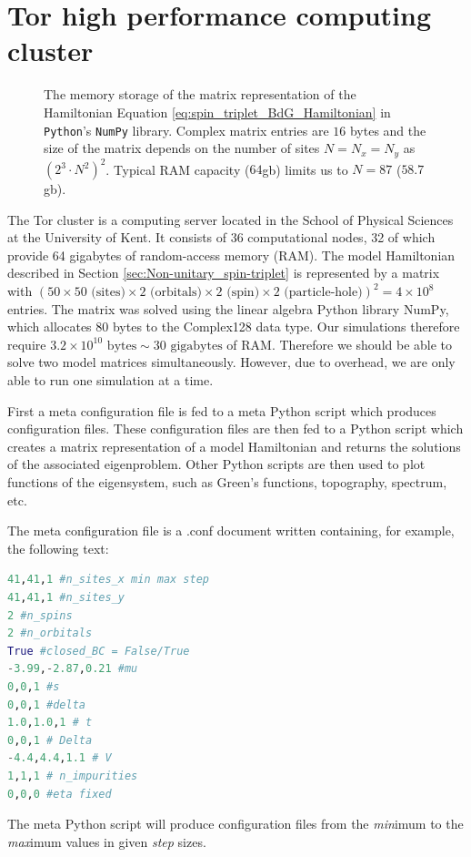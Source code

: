 \chapter{\label{ap:tor}Tor high performance computing cluster}
\graphicspath{{}}

\begin{figure}
    \begin{center}
        
    \end{center}
    \caption{\label{fig:Memory_usage_plot}
    The memory storage of the matrix representation of the Hamiltonian Equation \ref{eq:spin_triplet_BdG_Hamiltonian} in \texttt{Python}'s \texttt{NumPy} library. Complex matrix entries are $16$ bytes and the size of the matrix depends on the number of sites $N=N_x=N_y$ as $\left(2^3\cdot N^2\right)^2$. Typical RAM capacity ($64$gb) limits us to $N=87$ ($58.7$gb).
    }
\end{figure}

The Tor cluster is a computing server located in the School of Physical Sciences at the University of Kent. It consists of 36 computational nodes, 32 of which provide 64 gigabytes of random-access memory (RAM). The model Hamiltonian described in Section \ref{sec:Non-unitary_spin-triplet} is represented by a matrix with $(50 \times 50 \text{ (sites)} \times 2 \text{ (orbitals)} \times 2 \text{ (spin)} \times 2 \text{ (particle-hole)})^2 = 4\times 10^8$ entries. The matrix was solved using the linear algebra Python library NumPy, which allocates 80 bytes to the Complex128 data type. Our simulations therefore require $3.2\times 10^{10} \text{ bytes} \sim 30 \text{ gigabytes}$ of RAM. Therefore we should be able to solve two model matrices simultaneously. However, due to overhead, we are only able to run one simulation at a time.

First a meta configuration file is fed to a meta Python script which produces configuration files. These configuration files are then fed to a Python script which creates a matrix representation of a model Hamiltonian and returns the solutions of the associated eigenproblem. Other Python scripts are then used to plot functions of the eigensystem, such as Green's functions, topography, spectrum, etc.

The meta configuration file is a .conf document written containing, for example, the following text:
\begin{lstlisting}[language=Python]
41,41,1 #n_sites_x min max step
41,41,1 #n_sites_y
2 #n_spins
2 #n_orbitals
True #closed_BC = False/True
-3.99,-2.87,0.21 #mu
0,0,1 #s
0,0,1 #delta
1.0,1.0,1 # t
0,0,1 # Delta
-4.4,4.4,1.1 # V
1,1,1 # n_impurities
0,0,0 #eta fixed
\end{lstlisting}
The meta Python script will produce configuration files from the \textit{min}imum to the \textit{max}imum values in given \textit{step} sizes.

